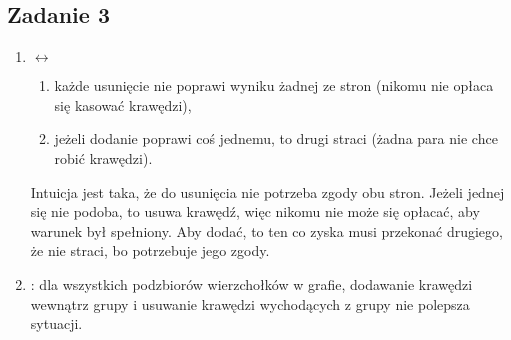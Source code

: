 \subsection{Zadanie 3}
\begin{enumerate}
  \item
     $\leftrightarrow$
    \begin{enumerate}
      \item
         każde usunięcie nie poprawi wyniku żadnej ze stron (nikomu nie opłaca się kasować krawędzi),
       \item
         jeżeli dodanie poprawi coś jednemu, to drugi straci
         (żadna para nie chce robić krawędzi).
     \end{enumerate}

     Intuicja jest taka, że do usunięcia nie potrzeba zgody obu stron. Jeżeli
     jednej się nie podoba, to usuwa krawędź, więc nikomu nie może się opłacać,
     aby warunek był spełniony. Aby dodać, to ten co zyska musi przekonać
     drugiego, że nie straci, bo potrzebuje jego zgody.

   \item
     : dla wszystkich podzbiorów wierzchołków w
        grafie, dodawanie krawędzi wewnątrz grupy i usuwanie krawędzi
        wychodących z grupy nie polepsza sytuacji.
\end{enumerate}

